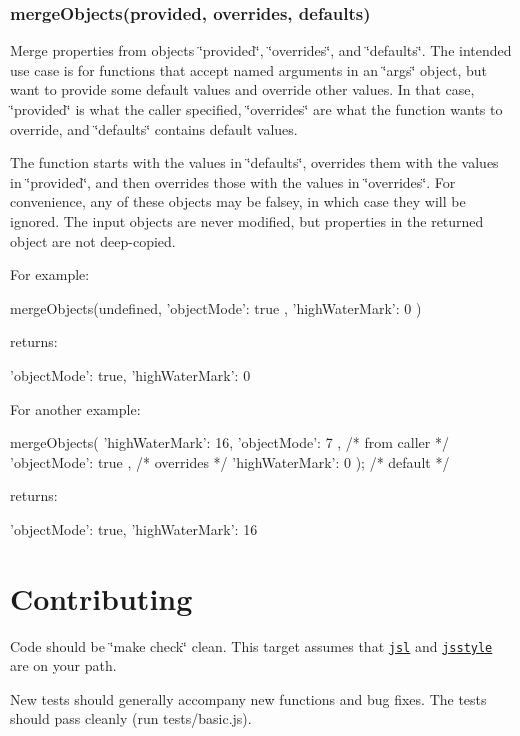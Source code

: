 \subsubsection*{merge\+Objects(provided, overrides, defaults)}

Merge properties from objects \char`\"{}provided\char`\"{}, \char`\"{}overrides\char`\"{}, and \char`\"{}defaults\char`\"{}. The intended use case is for functions that accept named arguments in an \char`\"{}args\char`\"{} object, but want to provide some default values and override other values. In that case, \char`\"{}provided\char`\"{} is what the caller specified, \char`\"{}overrides\char`\"{} are what the function wants to override, and \char`\"{}defaults\char`\"{} contains default values.

The function starts with the values in \char`\"{}defaults\char`\"{}, overrides them with the values in \char`\"{}provided\char`\"{}, and then overrides those with the values in \char`\"{}overrides\char`\"{}. For convenience, any of these objects may be falsey, in which case they will be ignored. The input objects are never modified, but properties in the returned object are not deep-\/copied.

For example\+: \begin{DoxyVerb}mergeObjects(undefined, { 'objectMode': true }, { 'highWaterMark': 0 })
\end{DoxyVerb}


returns\+: \begin{DoxyVerb}{ 'objectMode': true, 'highWaterMark': 0 }
\end{DoxyVerb}


For another example\+: \begin{DoxyVerb}mergeObjects(
    { 'highWaterMark': 16, 'objectMode': 7 }, /* from caller */
    { 'objectMode': true },                   /* overrides */
    { 'highWaterMark': 0 });                  /* default */
\end{DoxyVerb}


returns\+: \begin{DoxyVerb}{ 'objectMode': true, 'highWaterMark': 16 }
\end{DoxyVerb}


\section*{Contributing}

Code should be \char`\"{}make check\char`\"{} clean. This target assumes that \href{http://github.com/davepacheco/javascriptlint}{\tt jsl} and \href{http://github.com/davepacheco/jsstyle}{\tt jsstyle} are on your path.

New tests should generally accompany new functions and bug fixes. The tests should pass cleanly (run tests/basic.\+js). 